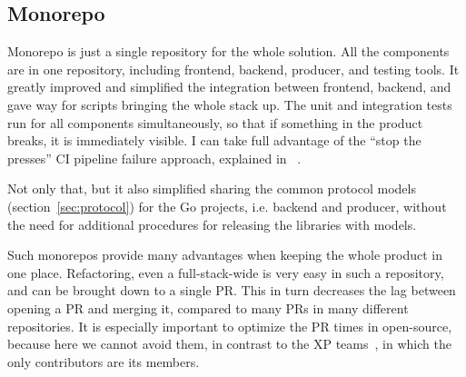 \subsection{Monorepo}\label{sec:monorepo}

Monorepo is just a single repository
for the whole solution.
All the components are in one repository,
including frontend,
backend,
producer, and
testing tools.
It greatly improved and simplified
the integration between frontend, backend,
and gave way for scripts
bringing the whole stack up.
The unit and integration tests run for all
components simultaneously,
so that if something in the product breaks,
it is immediately visible.
I can take full advantage of the
``stop the presses'' CI pipeline failure approach,
explained in ~\cite{martin_clean_2011}.

Not only that,
but it also simplified sharing
the common protocol models (section~\ref{sec:protocol})
for the Go projects, i.e. backend and producer,
without the need for additional procedures
for releasing the libraries with models.

Such monorepos provide many advantages
when keeping the whole product in one place.
Refactoring,
even a full-stack-wide
is very easy in such a repository,
and can be brought down to a single PR.
This in turn decreases the lag between
opening a PR and merging it,
compared to many PRs in many different repositories.
It is especially important
to optimize the PR times in open-source,
because here we cannot avoid them,
in contrast to the XP teams~\cite{beck_extreme_2004},
in which the only contributors are its members.
